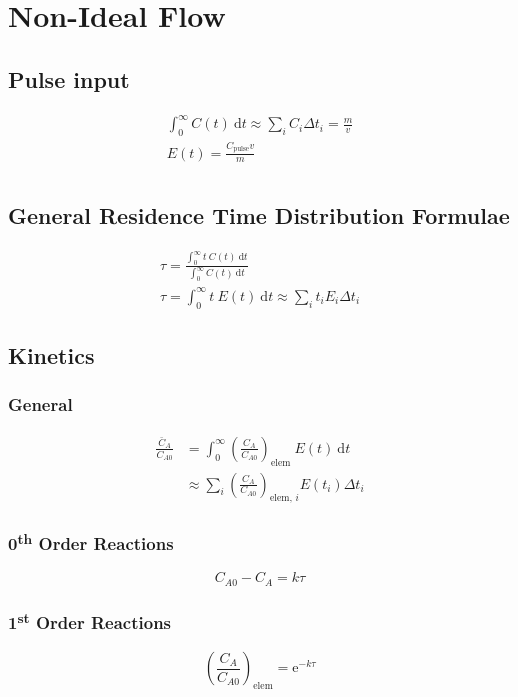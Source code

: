 \documentclass[10pt, oneside, twocolumn]{article}
\numberwithin{equation}{section}
\begin{document}
	\section{Non-Ideal Flow}
	\subsection{Pulse input}
		\begin{gather}
		\int_0^\infty C(t) \ \mathrm{d}t\approx\sum_i C_i \Delta t_i=\frac{m}{v}\\
		E(t)=\frac{C_\mathrm{pulse}v}{m}\\
		\end{gather}

	\subsection{General Residence Time Distribution Formulae}
		\begin{gather}
		\tau=\frac{\int_0^\infty t \ C(t) \ \mathrm{d}t}{\int_0^\infty C(t) \ \mathrm{d}t}\\
		\tau=\int_0^\infty t \ E(t)\ \mathrm{d}t\approx\sum_i t_i E_i \Delta t_i
		\end{gather}
	
	\subsection{Kinetics}
		\subsubsection{General}
			\begin{align}
			\frac{\bar{C}_A}{C_{A0}}&=\int_0^\infty {\left(\frac{C_A}{C_{A0}}\right)}_{\mathrm{elem}} \ E(t) \ \mathrm{d}t\\
			&\approx \sum_i {\left(\frac{C_A}{C_{A0}}\right)}_{\textrm{elem, }i} E(t_i) \Delta t_i
			\end{align}
		\subsubsection{0\textsuperscript{th} Order Reactions}
			\begin{equation}
			C_{A0}-C_A=k\tau
			\end{equation}
		\subsubsection{1\textsuperscript{st} Order Reactions}
			\begin{equation}
			{\left(\frac{C_A}{C_{A0}}\right)}_{\mathrm{elem}}=\mathrm{e}^{-k\tau}
			\end{equation}
\end{document}
